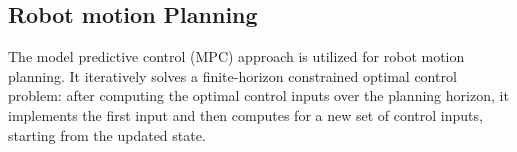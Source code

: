 \documentclass[letterpaper, 10 pt, conference]{ieeeconf}
\newcommand{\todonote}[1]{\vspace{0px} %
	\todo[inline, color=green!30]{\textbf{[Note:]} {#1}} %
}
\begin{document}
	\subsection{Robot motion Planning}\label{subsec:robot_path_plan}
	The model predictive control (MPC) approach is utilized for robot motion planning.
	It iteratively solves a finite-horizon constrained optimal control problem:
	after computing the optimal control inputs over the planning horizon, it implements the first input and then computes for a new set of control inputs, starting from the updated state.
\end{document}
